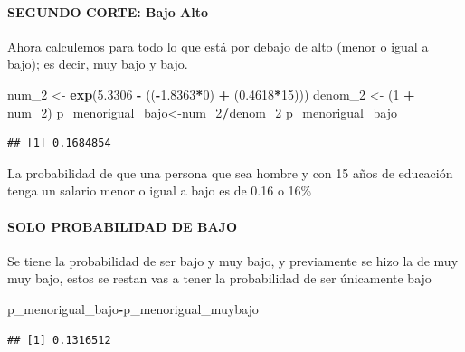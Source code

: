 \documentclass[
]{article}
\newenvironment{Shaded}{\begin{snugshade}}{\end{snugshade}}
\newcommand{\DecValTok}[1]{\textcolor[rgb]{0.00,0.00,0.81}{#1}}
\newcommand{\FloatTok}[1]{\textcolor[rgb]{0.00,0.00,0.81}{#1}}
\newcommand{\FunctionTok}[1]{\textcolor[rgb]{0.13,0.29,0.53}{\textbf{#1}}}
\newcommand{\NormalTok}[1]{#1}
\newcommand{\OtherTok}[1]{\textcolor[rgb]{0.56,0.35,0.01}{#1}}
\newcommand{\SpecialCharTok}[1]{\textcolor[rgb]{0.81,0.36,0.00}{\textbf{#1}}}
\begin{document}
\hypertarget{segundo-corte-bajo-alto}{%
\paragraph{\texorpdfstring{\textbf{SEGUNDO CORTE: Bajo \textbar{}
Alto}}{SEGUNDO CORTE: Bajo \textbar{} Alto}}\label{segundo-corte-bajo-alto}}

Ahora calculemos para todo lo que está por debajo de alto (menor o igual
a bajo); es decir, muy bajo y bajo.

\begin{Shaded}
\begin{Highlighting}[]
\NormalTok{num\_2 }\OtherTok{\textless{}{-}} \FunctionTok{exp}\NormalTok{(}\FloatTok{5.3306} \SpecialCharTok{{-}}\NormalTok{ ((}\SpecialCharTok{{-}}\FloatTok{1.8363}\SpecialCharTok{*}\DecValTok{0}\NormalTok{) }\SpecialCharTok{+}\NormalTok{ (}\FloatTok{0.4618}\SpecialCharTok{*}\DecValTok{15}\NormalTok{)))}
\NormalTok{denom\_2 }\OtherTok{\textless{}{-}}\NormalTok{ (}\DecValTok{1} \SpecialCharTok{+}\NormalTok{ num\_2)}
\NormalTok{p\_menorigual\_bajo}\OtherTok{\textless{}{-}}\NormalTok{num\_2}\SpecialCharTok{/}\NormalTok{denom\_2}
\NormalTok{p\_menorigual\_bajo}
\end{Highlighting}
\end{Shaded}

\begin{verbatim}
## [1] 0.1684854
\end{verbatim}

La probabilidad de que una persona que sea hombre y con 15 años de
educación tenga un salario menor o igual a bajo es de 0.16 o 16\%

\hypertarget{solo-probabilidad-de-bajo}{%
\paragraph{SOLO PROBABILIDAD DE BAJO}\label{solo-probabilidad-de-bajo}}

Se tiene la probabilidad de ser bajo y muy bajo, y previamente se hizo
la de muy muy bajo, estos se restan vas a tener la probabilidad de ser
únicamente bajo

\begin{Shaded}
\begin{Highlighting}[]
\NormalTok{p\_menorigual\_bajo}\SpecialCharTok{{-}}\NormalTok{p\_menorigual\_muybajo}
\end{Highlighting}
\end{Shaded}

\begin{verbatim}
## [1] 0.1316512
\end{verbatim}
\end{document}
